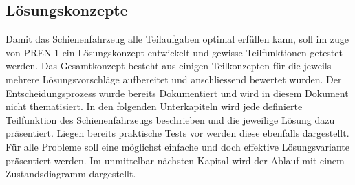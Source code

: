 \documentclass[../../main.tex]{subfiles}
\begin{document}
\subsection{Lösungskonzepte}
Damit das Schienenfahrzeug alle Teilaufgaben optimal erfüllen kann, soll im zuge von PREN 1 ein Lösungskonzept entwickelt und gewisse Teilfunktionen getestet werden. Das Gesamtkonzept besteht aus einigen Teilkonzepten für die jeweils mehrere Lösungsvorschläge aufbereitet und anschliessend bewertet wurden. Der Entscheidungsprozess wurde bereits Dokumentiert und wird in diesem Dokument nicht thematisiert. In den folgenden Unterkapiteln wird jede definierte Teilfunktion des Schienenfahrzeugs beschrieben und die jeweilige Lösung dazu präsentiert. Liegen bereits praktische Tests vor werden diese ebenfalls dargestellt. Für alle Probleme soll eine möglichst einfache und doch effektive Lösungsvariante präsentiert werden.
Im unmittelbar nächsten Kapital wird der Ablauf mit einem Zustandsdiagramm dargestellt.
\end{document}
